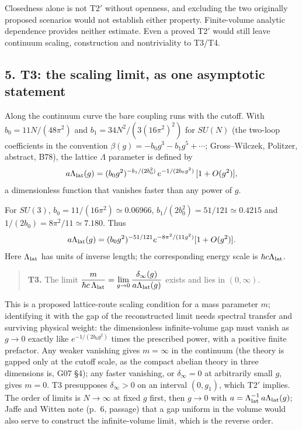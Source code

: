 \documentclass[11pt,a4paper]{article}
\begin{document}
Closedness alone is not T2\('\) without openness, and excluding the two
originally proposed scenarios would not establish either property.
Finite-volume analytic dependence provides neither estimate. Even a
proved T2\('\) would still leave continuum scaling, construction and
nontriviality to T3/T4.

\subsection{5. T3: the scaling limit, as one asymptotic
statement}\label{t3-the-scaling-limit-as-one-asymptotic-statement}

Along the continuum curve the bare coupling runs with the cutoff. With
\(b_0=11N/(48\pi^2)\) and \(b_1=34N^2/(3(16\pi^2)^2)\) for \(SU(N)\)
(the two-loop coefficients in the convention
\(\beta(g)=-b_0g^3-b_1g^5+\cdots\); Gross--Wilczek, Politzer, abstract,
B78), the lattice \(\Lambda\) parameter is defined by
\[a\Lambda_{\rm lat}(g)=(b_0g^2)^{-b_1/(2b_0^2)}\,e^{-1/(2b_0g^2)}\,[1+O(g^2)],\]
a dimensionless function that vanishes faster than any power of \(g\).

For \(SU(3)\), \(b_0=11/(16\pi^2)\simeq0.06966\),
\(b_1/(2b_0^2)=51/121\simeq0.4215\) and
\(1/(2b_0)=8\pi^2/11\simeq7.180\). Thus
\[a\Lambda_{\rm lat}(g)=(b_0g^2)^{-51/121}
e^{-8\pi^2/(11g^2)}[1+O(g^2)].\] Here \(\Lambda_{\rm lat}\) has units of
inverse length; the corresponding energy scale is
\(\hbar c\Lambda_{\rm lat}\).

\begin{quote}
\textbf{T3.} The limit
\(\displaystyle\frac{m}{\hbar c\,\Lambda_{\rm lat}}
=\lim_{g\to0}\frac{\delta_\infty(g)}{a\Lambda_{\rm lat}(g)}\) exists and
lies in \((0,\infty)\).
\end{quote}

This is a proposed lattice-route scaling condition for a mass parameter
\(m\); identifying it with the gap of the reconstructed limit needs
spectral transfer and surviving physical weight: the dimensionless
infinite-volume gap must vanish as \(g\to0\) exactly like
\(e^{-1/(2b_0g^2)}\) times the prescribed power, with a positive finite
prefactor. Any weaker vanishing gives \(m=\infty\) in the continuum (the
theory is gapped only at the cutoff scale, as the compact abelian theory
in three dimensions is, G07 §4); any faster vanishing, or
\(\delta_\infty=0\) at arbitrarily small \(g\), gives \(m=0\). T3
presupposes \(\delta_\infty>0\) on an interval \((0,g_1)\), which
T2\('\) implies. The order of limits is \(N\to\infty\) at fixed \(g\)
first, then \(g\to0\) with
\(a=\Lambda_{\rm lat}^{-1}\,a\Lambda_{\rm lat}(g)\); Jaffe and Witten
note (p.~6, passage) that a gap uniform in the volume would also serve
to construct the infinite-volume limit, which is the reverse order.
\end{document}
